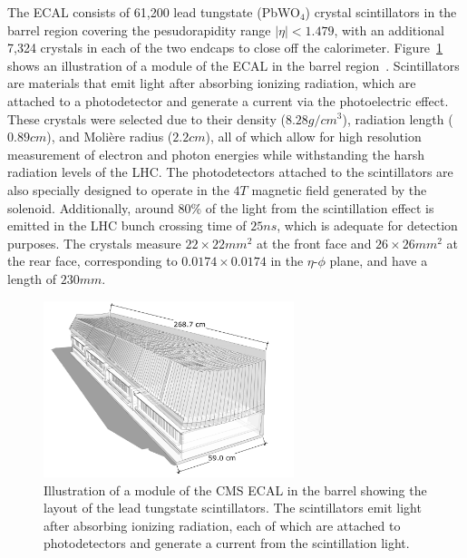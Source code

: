 The ECAL consists of 61,200 lead tungstate (PbWO$_4$) crystal scintillators in the barrel region covering the pesudorapidity range $|\eta|<1.479$, with an additional 7,324 crystals in each of the two endcaps to close off the calorimeter.
Figure~\ref{fig:CMSECAL} shows an illustration of a module of the ECAL in the barrel region~\cite{Sakuma_2014}.
Scintillators are materials that emit light after absorbing ionizing radiation, which are attached to a photodetector and generate a current via the photoelectric effect.
These crystals were selected due to their density ($8.28\unit{g/cm^3}$), radiation length ($0.89\unit{cm}$), and Moli\`{e}re radius ($2.2\unit{cm}$), all of which allow for high resolution measurement of electron and photon energies while withstanding the harsh radiation levels of the LHC.
The photodetectors attached to the scintillators are also specially designed to operate in the $4\unit{T}$ magnetic field generated by the solenoid.
Additionally, around 80\% of the light from the scintillation effect is emitted in the LHC bunch crossing time of $25\unit{ns}$, which is adequate for detection purposes.
The crystals measure $22\times22\unit{mm^2}$ at the front face and $26\times26\unit{mm^2}$ at the rear face, corresponding to $0.0174\times0.0174$ in the $\eta$-$\phi$ plane, and have a length of $230\unit{mm}$.

\begin{figure}[htbp]
  \centering
  \includegraphics[width=0.65\textwidth]{fig/experiment/20130816_01_EB_module_1.pdf}
  \caption{
    Illustration of a module of the CMS ECAL in the barrel showing the layout of the lead tungstate scintillators.
    The scintillators emit light after absorbing ionizing radiation, each of which are attached to photodetectors and generate a current from the scintillation light.
  }
  \label{fig:CMSECAL}
\end{figure}

